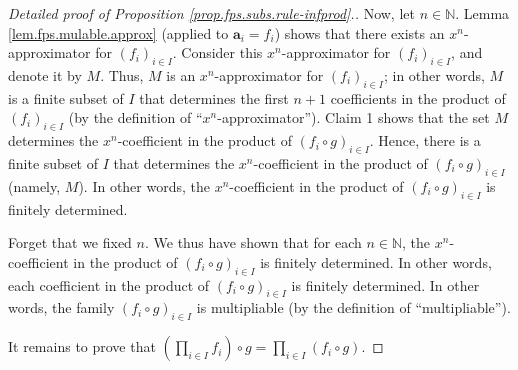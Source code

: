 \begin{proof}[Detailed proof of Proposition \ref{prop.fps.subs.rule-infprod}.]
Now, let $n\in\mathbb{N}$. Lemma \ref{lem.fps.mulable.approx} (applied to
$\mathbf{a}_{i}=f_{i}$) shows that there exists an $x^{n}$-approximator for
$\left(  f_{i}\right)  _{i\in I}$. Consider this $x^{n}$-approximator for
$\left(  f_{i}\right)  _{i\in I}$, and denote it by $M$. Thus, $M$ is an
$x^{n}$-approximator for $\left(  f_{i}\right)  _{i\in I}$; in other words,
$M$ is a finite subset of $I$ that determines the first $n+1$ coefficients in
the product of $\left(  f_{i}\right)  _{i\in I}$ (by the definition of
``$x^{n}$-approximator''). Claim 1 shows that
the set $M$ determines the $x^{n}$-coefficient in the product of $\left(
f_{i}\circ g\right)  _{i\in I}$. Hence, there is a finite subset of $I$ that
determines the $x^{n}$-coefficient in the product of $\left(  f_{i}\circ
g\right)  _{i\in I}$ (namely, $M$). In other words, the $x^{n}$-coefficient in
the product of $\left(  f_{i}\circ g\right)  _{i\in I}$ is finitely determined.

Forget that we fixed $n$. We thus have shown that for each $n\in\mathbb{N}$,
the $x^{n}$-coefficient in the product of $\left(  f_{i}\circ g\right)  _{i\in
I}$ is finitely determined. In other words, each coefficient in the product of
$\left(  f_{i}\circ g\right)  _{i\in I}$ is finitely determined. In other
words, the family $\left(  f_{i}\circ g\right)  _{i\in I}$ is multipliable (by
the definition of ``multipliable''). \medskip

It remains to prove that $\left(  \prod_{i\in I}f_{i}\right)  \circ
g=\prod_{i\in I}\left(  f_{i}\circ g\right)  $.


\end{proof}
